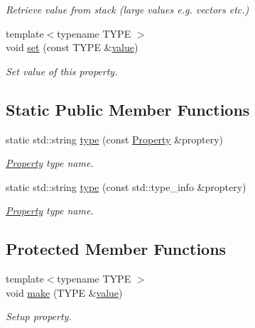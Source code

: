 \begin{DoxyCompactItemize}
\begin{DoxyCompactList}\small\item\em Retrieve value from stack (large values e.\+g. vectors etc.) \end{DoxyCompactList}\item 
{\footnotesize template$<$typename T\+Y\+PE $>$ }\\void \hyperlink{class_d_d4hep_1_1_property_a77f106d95462fad8c938a9568941854e}{set} (const T\+Y\+PE \&\hyperlink{class_d_d4hep_1_1_property_a5caa53b1278d2e91da0606fbb312f967}{value})
\begin{DoxyCompactList}\small\item\em Set value of this property. \end{DoxyCompactList}\end{DoxyCompactItemize}
\subsection*{Static Public Member Functions}
\begin{DoxyCompactItemize}
\item 
static std\+::string \hyperlink{class_d_d4hep_1_1_property_a77de012a4b602cc74b395050128d289c}{type} (const \hyperlink{class_d_d4hep_1_1_property}{Property} \&proptery)
\begin{DoxyCompactList}\small\item\em \hyperlink{class_d_d4hep_1_1_property}{Property} type name. \end{DoxyCompactList}\item 
static std\+::string \hyperlink{class_d_d4hep_1_1_property_aeeb502311c3a963033cd82c82e2874d9}{type} (const std\+::type\+\_\+info \&proptery)
\begin{DoxyCompactList}\small\item\em \hyperlink{class_d_d4hep_1_1_property}{Property} type name. \end{DoxyCompactList}\end{DoxyCompactItemize}
\subsection*{Protected Member Functions}
\begin{DoxyCompactItemize}
\item 
{\footnotesize template$<$typename T\+Y\+PE $>$ }\\void \hyperlink{class_d_d4hep_1_1_property_a1b5ee0c9ca70c4960f7173b091ab0837}{make} (T\+Y\+PE \&\hyperlink{class_d_d4hep_1_1_property_a5caa53b1278d2e91da0606fbb312f967}{value})
\begin{DoxyCompactList}\small\item\em Setup property. \end{DoxyCompactList}\end{DoxyCompactItemize}
